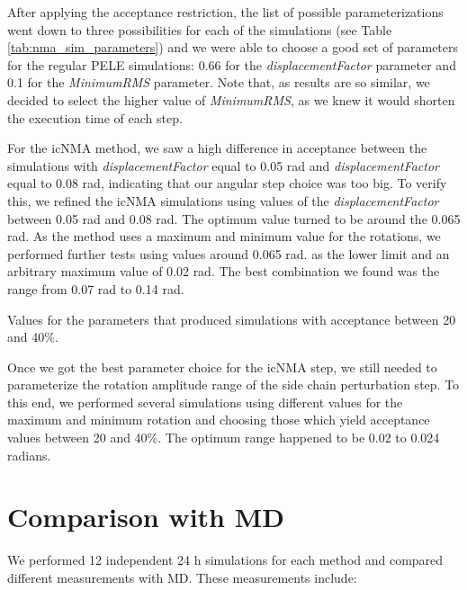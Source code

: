 After applying the acceptance restriction, the list of possible parameterizations went down to three possibilities for each of the simulations (see Table \ref{tab:nma_sim_parameters}) and we were able to choose a good set of parameters for the regular PELE simulations: 0.66 \angstrom for the \textit{displacementFactor} parameter and 0.1 for the \textit{MinimumRMS} parameter. Note that, as results are so similar, we decided to select the higher value of \textit{MinimumRMS}, as we knew it would shorten the execution time of each step. 

For the icNMA method, we saw a high difference in acceptance between the simulations with \textit{displacementFactor} equal to 0.05 rad and \textit{displacementFactor} equal to 0.08 rad, indicating that our angular step choice was too big. To verify this, we refined the icNMA simulations using values of the \textit{displacementFactor} between 0.05 rad and 0.08 rad. The optimum value turned to be around the 0.065 rad. As the method uses a maximum and minimum value for the rotations, we performed further tests using values around 0.065 rad. as the lower limit and an arbitrary maximum value of 0.02 rad. The best combination we found was the range from 0.07 rad to 0.14 rad. 

\begin{table}
\centering

\caption{Values for the parameters that produced simulations with acceptance between 20 and 40\%.}
\label{tab:nma_sim_parameters}
\end{table}

Once we got the best parameter choice for the icNMA step, we still needed to parameterize the rotation amplitude range of the side chain perturbation step. To this end, we performed several simulations using different values for the maximum and minimum rotation and choosing those which yield acceptance values between 20 and 40\%. The optimum range happened to be 0.02 to 0.024 radians.

\section{Comparison with MD}
We performed 12 independent 24 h simulations for each method and compared different measurements with MD. These measurements include:

